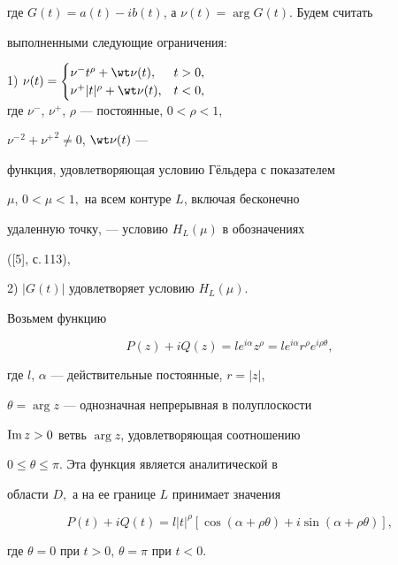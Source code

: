 где $G(t)=a(t)-ib(t)$, а $\nu (t)=\arg G(t).$ Будем считать


выполненными следующие ограничения:





1) $\nu (t) =\begin{cases}


\nu^{-}t^{\rho} + \wt\nu (t),&  t > 0, \\


\nu^{+}|t|^{\rho} + \wt\nu (t),&  t < 0,


\end{cases}$\\


где $\nu^{-}$, $\nu^{+}$, $\rho$ --- постоянные, $0<\rho<1$,


${\nu^{-}}^2+{\nu^{+}}^2\neq 0$, $\wt\nu (t)$ ---


функция, удовлетворяющая условию Г\"ельдера с показателем


$\mu$, $0 < \mu < 1,$ на всем контуре $L$, включая бесконечно


удаленную точку, --- условию $H_{L}(\mu)$ в обозначениях


([5], с.\,113),





2) $|G(t)|$ удовлетворяет условию $H_L(\mu)$.





Возьмем функцию


$$


P(z) + iQ(z) = le^{i\alpha}z^{\rho} =


le^{i\alpha}r^{\rho}e^{i\rho\theta},


$$


где $l$, $\alpha$ --- действительные постоянные, $r=|z|$,


$\theta = \arg z$ --- однозначная непрерывная в полуплоскости


$\operatorname{Im} z > 0$ ветвь $\arg z$, удовлетворяющая соотношению


$0\leq \theta \leq \pi.$ Эта функция является аналитической в


области $D,$ а на ее границе $L$ принимает значения


$$


P(t) + iQ(t) = l|t|^{\rho}[\cos (\alpha + \rho\theta) + i\sin(\alpha +


\rho\theta) ],


$$


где $\theta = 0$ при $t > 0$, $\theta = \pi$ при $t < 0.$






